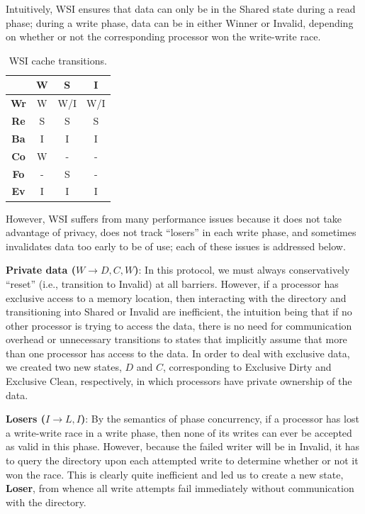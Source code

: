 \documentclass{article}
\begin{document}
Intuitively, WSI ensures that data can only be in the Shared state during a read phase; during a write phase, data can be in either Winner or Invalid, depending on whether or not the corresponding processor won the write-write race. 

\begin{table}[H]
\centering
\caption{WSI cache transitions.}
\label{wsi-cache-protocol}
\begin{tabular}{|c|c|c|c|}
\hline
 & \textbf{W} & \textbf{S} & \textbf{I} \\ \hline
\textbf{Wr} & W & W/I & W/I \\ \hline
\textbf{Re} & S & S & S \\ \hline
\textbf{Ba} & I & I & I \\ \hline
\textbf{Co} & W & - & - \\ \hline
\textbf{Fo} & - & S & - \\ \hline
\textbf{Ev} & I & I & I \\ \hline
\end{tabular}
\end{table}

However, WSI suffers from many performance issues because it does not take advantage of privacy, does not track ``losers'' in each write phase, and sometimes invalidates data too early to be of use; each of these issues is addressed below.

\textbf{Private data ($W \rightarrow D, C, W$)}:
In this protocol, we must always conservatively ``reset'' (i.e., transition to Invalid) at all barriers. However, if a processor has exclusive access to a memory location, then interacting with the directory and transitioning into Shared or Invalid are inefficient, the intuition being that if no other processor is trying to access the data, there is no need for communication overhead or unnecessary transitions to states that implicitly assume that more than one processor has access to the data. In order to deal with exclusive data, we created two new states, $D$ and $C$, corresponding to Exclusive Dirty and Exclusive Clean, respectively, in which processors have private ownership of the data.

\textbf{Losers ($I \rightarrow L, I$)}: 
By the semantics of phase concurrency, if a processor has lost a write-write race in a write phase, then none of its writes can ever be accepted as valid in this phase. However, because the failed writer will be in Invalid, it has to query the directory upon each attempted write to determine whether or not it won the race. This is clearly quite inefficient and led us to create a new state, \textbf{Loser}, from whence all write attempts fail immediately without communication with the directory.
\end{document}
